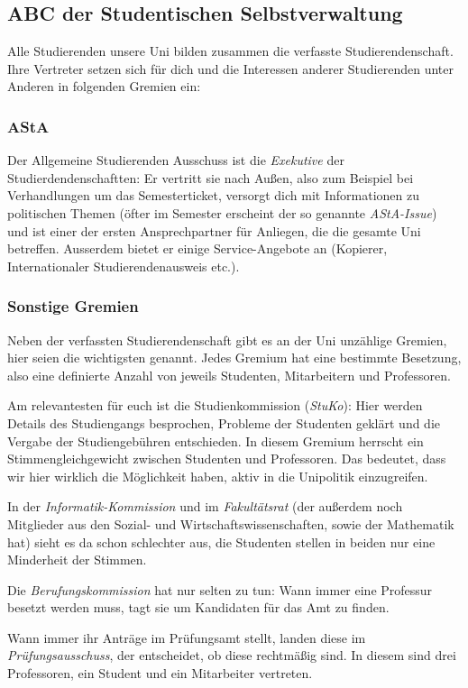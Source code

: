 	\subsection{ABC der Studentischen Selbstverwaltung}
	Alle Studierenden unsere Uni bilden zusammen die verfasste
	Studierendenschaft. Ihre Vertreter setzen sich für dich und die
	Interessen anderer Studierenden unter Anderen in folgenden
	Gremien ein:

	\subsubsection*{AStA}
		Der Allgemeine Studierenden Ausschuss ist die
		\emph{Exekutive} der Studierdendenschaftten: Er vertritt
		sie nach Außen, also zum Beispiel bei Verhandlungen um
		das Semesterticket, versorgt dich mit Informationen zu
		politischen Themen (öfter im Semester erscheint der so
		genannte \emph{AStA-Issue}) und ist einer der ersten
		Ansprechpartner für  Anliegen, die die gesamte Uni
		betreffen. Ausserdem bietet er einige Service-Angebote
		an (Kopierer, Internationaler Studierendenausweis etc.).

		\subsubsection*{Sonstige Gremien}
		Neben der verfassten Studierendenschaft gibt es an der Uni  unzählige Gremien, hier seien die wichtigsten genannt. Jedes Gremium hat eine bestimmte Besetzung, also eine definierte Anzahl von jeweils Studenten, Mitarbeitern und Professoren.

		Am relevantesten für euch ist die Studienkommission (\emph{StuKo}): Hier werden Details des Studiengangs besprochen, Probleme der Studenten geklärt und die Vergabe der Studiengebühren entschieden. In diesem Gremium herrscht ein Stimmengleichgewicht zwischen Studenten und Professoren. Das bedeutet, dass wir hier wirklich die Möglichkeit haben, aktiv in die Unipolitik einzugreifen.

		In der \emph{Informatik-Kommission} und im
		\emph{Fakultätsrat} (der außerdem noch Mitglieder aus
		den Sozial- und Wirtschaftswissenschaften, sowie der Mathematik hat) sieht es da schon schlechter aus, die Studenten stellen in beiden nur eine Minderheit der Stimmen.

		Die \emph{Berufungskommission} hat nur selten zu tun: Wann immer eine Professur besetzt werden muss, tagt sie um Kandidaten für das Amt zu finden.

		Wann immer ihr Anträge im Prüfungsamt stellt, landen diese im \emph{Prüfungsausschuss}, der entscheidet, ob diese rechtmäßig sind. In diesem sind drei Professoren, ein Student und ein Mitarbeiter vertreten.

